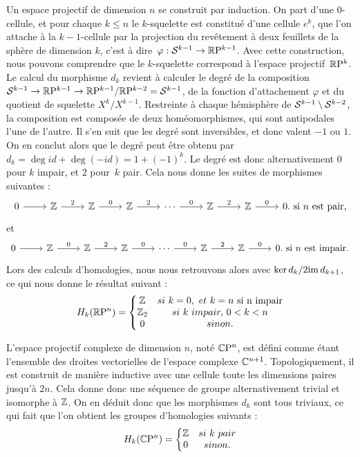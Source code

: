 \begin{exemple}
Un espace projectif de dimension $n$ se construit par induction. On part d'une 0-cellule, et pour chaque $k\leq n$ le $k$-squelette est constitué d'une cellule $e^k$, que l'on attache à la $k-1$-cellule par la projection du revêtement à deux feuillets de la sphère de dimension $k$, c'est à dire~${\varphi:\mathcal{S}^{k-1}\to\mathbb{R}\mathrm{P}^{k-1}}$. Avec cette construction, nous pouvons comprendre que le $k$-squelette correspond à l'espace projectif~$\mathbb{R}\mathrm{P}^k$. Le calcul du morphisme $d_k$ revient à calculer le degré de la composition~${\mathcal{S}^{k-1}\to \mathbb{R}\mathrm{P}^{k-1}\to\mathbb{R}\mathrm{P}^{k-1}/\mathbb{R}\mathrm{P}^{k-2}=\mathcal{S}^{k-1}}$, de la fonction d'attachement $\varphi$ et du quotient de squelette $X^k/X^{k-1}$. Restreinte à chaque hémisphère de $\mathcal{S}^{k-1}\setminus\mathcal{S}^{k-2}$, la composition est composée de deux homéomorphismes, qui sont antipodales l'une de l'autre. Il s'en suit que les degré sont inversibles, et donc valent $-1$ ou $1$. On en conclut alors que le degré peut être obtenu par~${d_k=\deg id+\deg (-id)=1+(-1)^k}$. Le degré est donc alternativement 0 pour $k$ impair, et $2$ pour~$k$ pair. Cela nous donne les suites de morphismes suivantes : \[\begin{tikzcd}
    0\arrow[r]&\bb{Z}\arrow[r,"2"]&\bb{Z}\arrow[r,"0"]&\bb{Z}\arrow[r,"2"]&\cdots\arrow[r,"0"]&\bb{Z}\arrow[r,"2"]&\bb{Z}\arrow[r,"0"]&0.\text{ si $n$ est pair,}
\end{tikzcd}\]
et
\[\begin{tikzcd}
    0\arrow[r]&\bb{Z}\arrow[r,"0"]&\bb{Z}\arrow[r,"2"]&\bb{Z}\arrow[r,"0"]&\cdots\arrow[r,"0"]&\bb{Z}\arrow[r,"2"]&\bb{Z}\arrow[r,"0"]&0.\text{ si $n$ est impair.}
\end{tikzcd}\]Lors des calculs d'homologies, nous nous retrouvons alors avec $\ker d_k/2\mathrm{im}\, d_{k+1}$, ce qui nous donne le résultat suivant : \[H_k(\mathbb{R}\mathrm{P}^n)=\left\{\begin{matrix}
\mathbb{Z}&si\ k=0,\ et\ k=n\text{ si n impair}\\
\mathbb{Z}_2&si\  k\ impair,\,0<k<n\\
0&sinon.
\end{matrix}\right.\]
\end{exemple}

\begin{exemple}
L'espace projectif complexe de dimension $n$, noté $\mathbb{C}\mathrm{P}^n$, est défini comme étant l'ensemble des droites vectorielles de l'espace complexe $\mathbb{C}^{n+1}$. Topologiquement, il est construit de manière inductive avec une cellule toute les dimensions paires jusqu'à $2n$. Cela donne donc une séquence de groupe alternativement trivial et isomorphe à $\mathbb{Z}$. On en déduit donc que les morphismes $d_k$ sont tous triviaux, ce qui fait que l'on obtient les groupes d'homologies suivants : \[H_k(\mathbb{C}\mathrm{P}^n)=\left\{\begin{matrix}
\mathbb{Z}&si\ k\ pair\\
0&sinon.
\end{matrix}\right.\]
\end{exemple}

